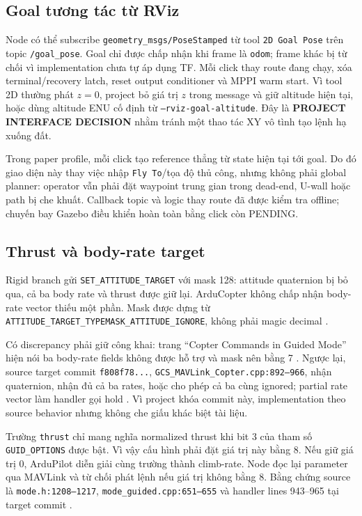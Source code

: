 \documentclass[11pt,a4paper]{article}
\newcommand{\code}[1]{\texttt{#1}}
\begin{document}
\subsection{Goal tương tác từ RViz}

Node có thể subscribe \code{geometry\_msgs/PoseStamped} từ tool
\code{2D Goal Pose} trên topic \code{/goal\_pose}. Goal chỉ được chấp nhận khi
frame là \code{odom}; frame khác bị từ chối vì implementation chưa tự áp dụng
TF. Mỗi click thay route đang chạy, xóa terminal/recovery latch, reset output
conditioner và MPPI warm start. Vì tool 2D thường phát $z=0$, project bỏ giá trị
$z$ trong message và giữ altitude hiện tại, hoặc dùng altitude ENU cố định từ
\code{--rviz-goal-altitude}. Đây là \textbf{PROJECT INTERFACE DECISION} nhằm
tránh một thao tác XY vô tình tạo lệnh hạ xuống đất.

Trong paper profile, mỗi click tạo reference thẳng từ state hiện tại tới goal.
Do đó giao diện này thay việc nhập \code{Fly To}/tọa độ thủ công, nhưng không
phải global planner: operator vẫn phải đặt waypoint trung gian trong dead-end,
U-wall hoặc path bị che khuất. Callback topic và logic thay route đã được kiểm
tra offline; chuyến bay Gazebo điều khiển hoàn toàn bằng click còn PENDING.

\subsection{Thrust và body-rate target}

Rigid branch gửi \code{SET\_ATTITUDE\_TARGET} với mask 128: attitude quaternion
bị bỏ qua, cả ba body rate và thrust được giữ lại. ArduCopter không chấp nhận
body-rate vector thiếu một phần. Mask được dựng từ
\code{ATTITUDE\_TARGET\_TYPEMASK\_ATTITUDE\_IGNORE}, không phải magic decimal
\cite{mavlinkCommon2026}.

Có discrepancy phải giữ công khai: trang ``Copter Commands in Guided Mode''
hiện nói ba body-rate fields không được hỗ trợ và mask nên bằng 7
\cite{ardupilotGuidedDocs2026}. Ngược lại, source target commit
\code{f808f78...}, \code{GCS\_MAVLink\_Copter.cpp:892--966}, nhận quaternion,
nhận đủ cả ba rates, hoặc cho phép cả ba cùng ignored; partial rate vector làm
handler gọi hold \cite{ardupilotSourceF808}. Vì project khóa commit này,
implementation theo source behavior nhưng không che giấu khác biệt tài liệu.

Trường \code{thrust} chỉ mang nghĩa normalized thrust khi bit 3 của tham số
\code{GUID\_OPTIONS} được bật. Vì vậy cấu hình phải đặt giá trị này bằng 8.
Nếu giữ giá trị 0, ArduPilot diễn giải cùng trường thành climb-rate. Node đọc
lại parameter qua MAVLink và từ chối phát lệnh nếu giá trị không bằng 8. Bằng
chứng source là \code{mode.h:1208--1217}, \code{mode\_guided.cpp:651--655} và
handler lines 943--965 tại target commit \cite{ardupilotSourceF808}.
\end{document}
